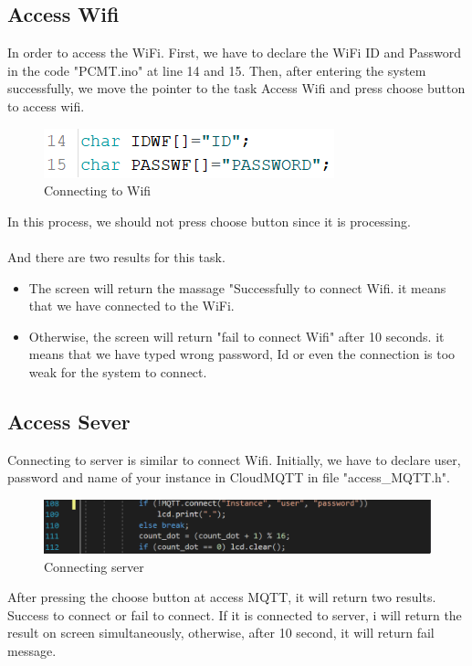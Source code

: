 \documentclass[12pt, a4paper, oneside]{article}
\begin{document}
\subsection{Access Wifi}
In order to access the WiFi. First, we have to declare the WiFi ID and Password in the code "PCMT.ino" at line 14 and 15. Then, after entering the system successfully, we move the pointer to the task Access Wifi and press choose button to access wifi. \\
\begin{figure}[H]
	\centering
	\includegraphics[width=0.6\linewidth]{wifi}
	\caption{Connecting to Wifi}
	\label{fig:ModelSim and De2i-150 board}
\end{figure}
In this process, we should not press choose button since it is processing.\\
\\
And there are two results for this task.\\
\begin{itemize}
	\item The screen will return the massage "Successfully to connect Wifi. it means that we have connected to the WiFi.
	\item  Otherwise, the screen will return "fail to connect Wifi" after 10 seconds. it means that we have typed wrong password, Id or even the connection is too weak for the system to connect.   
\end{itemize}  
\subsection{Access Sever}
Connecting to server is similar to connect Wifi. Initially, we have to declare user, password and name of your instance in CloudMQTT in file "access\_MQTT.h".
 \begin{figure}[H]
 	\centering
 	\includegraphics[width=0.8\linewidth]{server}
 	\caption{Connecting server}
 	\label{fig:ModelSim and De2i-150 board}
 \end{figure}
After pressing the choose button at access MQTT, it will return two results. Success to connect or fail to connect. If it is connected to server, i will return the result on screen simultaneously, otherwise, after 10 second, it will return fail message. 
\end{document}
